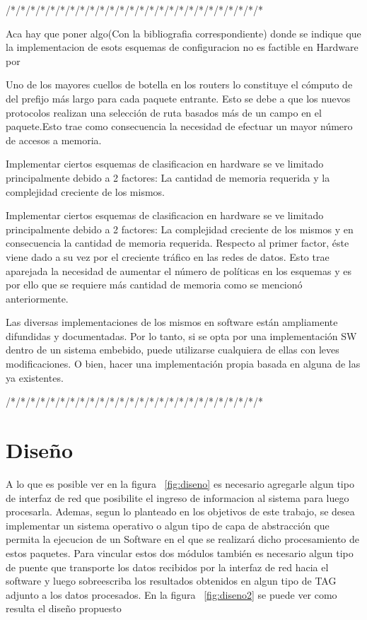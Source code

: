 /*/*/*/*/*/*/*/*/*/*/*/*/*/*/*/*/*/*/*/*/*/*/*/*/*/*

{Aca hay que poner algo(Con la bibliografia correspondiente) donde se indique que la implementacion de esots esquemas de configuracion no es factible en Hardware por}

Uno de los mayores cuellos de botella en los routers lo constituye el cómputo de del prefijo más largo para cada paquete entrante. Esto se debe a que los nuevos protocolos realizan una selección de ruta basados más de un campo en el paquete.Esto trae como consecuencia la necesidad de  efectuar un mayor número de accesos a memoria.

Implementar ciertos esquemas de clasificacion en hardware se ve limitado principalmente debido a 2 factores: La cantidad de memoria requerida y la complejidad creciente de los mismos.

Implementar ciertos esquemas de clasificacion en hardware se ve limitado principalmente debido a 2 factores: La complejidad creciente de los mismos y en consecuencia la cantidad de memoria requerida. Respecto al primer factor, éste viene dado a su vez por el creciente tráfico en las redes de datos. Esto trae aparejada la necesidad de aumentar el número de políticas en los esquemas y es por ello que se requiere más cantidad de memoria como se mencionó anteriormente.

Las diversas implementaciones de los mismos en software están ampliamente difundidas y documentadas. Por lo tanto, si se opta por una implementación SW dentro de un sistema embebido, puede utilizarse cualquiera de ellas con leves modificaciones. O bien, hacer una implementación propia basada en alguna de las ya existentes.

/*/*/*/*/*/*/*/*/*/*/*/*/*/*/*/*/*/*/*/*/*/*/*/*/*/*
%
\section{Diseño}
A lo que es posible ver en la figura ~\ref{fig:diseno} es necesario agregarle algun tipo de interfaz de red que posibilite el ingreso de informacion al sistema para luego procesarla. Ademas, segun lo planteado en los objetivos de este trabajo, se desea implementar un sistema operativo o algun tipo de capa de abstracción que permita la ejecucion de un Software en el que se realizará dicho procesamiento de estos paquetes. Para vincular estos dos módulos también es necesario algun tipo de puente que transporte los datos recibidos por la interfaz de red hacia el software y luego sobreescriba los resultados obtenidos en algun tipo de TAG adjunto a los datos procesados. En la figura ~\ref{fig:diseno2} se puede ver como resulta el diseño propuesto

